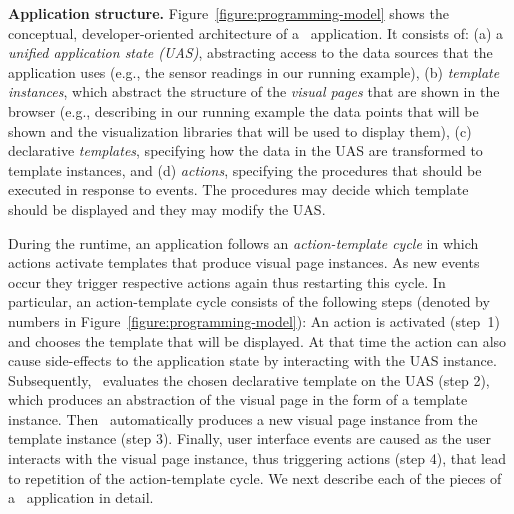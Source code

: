 \textbf{Application structure.} Figure~\ref{figure:programming-model} shows the conceptual, developer-oriented architecture of a \projname\ application. It consists of:
(a) a \textit{unified application state (UAS)}, abstracting access to the data sources that the application uses (e.g., the sensor readings in our running example), (b) \textit{template instances}, which abstract the structure of the \textit{visual pages} that are shown in the browser (e.g., describing in our running example the data points that will be shown and the visualization libraries that will be used to display them), %
(c) declarative \textit{templates}, specifying how the data in the UAS are transformed to template instances,
and (d) \textit{actions}, specifying the procedures that should be executed in response to events. The procedures may decide which template should be displayed and they may modify the UAS. 

During the runtime, an application follows an \textit{action-template cycle} in which actions activate templates that produce visual page instances. As new events occur they trigger respective actions again thus restarting this cycle. In particular, an action-template cycle consists of the following steps (denoted by numbers in Figure~\ref{figure:programming-model}): %
An action is activated (step~1) and chooses the template that will be displayed. At that time the action can also cause side-effects to the application state by interacting with the UAS instance. 
Subsequently, \projname\ evaluates the chosen declarative template on the UAS (step 2), which produces an abstraction of the visual page in the form of a template instance. Then \projname\ automatically produces a new visual page instance from the template instance (step 3). Finally, user interface events are caused as the user interacts with the visual page instance, thus triggering actions (step 4), that lead to repetition of the action-template cycle. We next describe each of the pieces of a \projname\ application in detail. 

